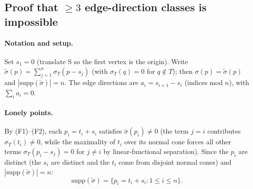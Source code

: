 %
%
%

\subsection*{Proof that $\geq 3$ edge-direction classes is impossible}

\paragraph{Notation and setup.}
Set $s_1=0$ (translate S so the first vertex is the origin).
Write $\tilde\sigma(p)=\sum_{j=1}^n \sigma_T(p-s_j)$
(with $\sigma_T(q)=0$ for $q\notin T$); then $\sigma(p)=\tilde\sigma(p)$
and $|\mathrm{supp}(\tilde\sigma)|=n$.
The edge directions are $a_i=s_{i+1}-s_i$ (indices mod $n$), with $\sum_i a_i=0$.

\paragraph{Lonely points.}
By (F1)--(F2), each $p_i=t_i+s_i$ satisfies $\tilde\sigma(p_i)\ne 0$
(the term $j=i$ contributes $\sigma_T(t_i)\ne0$, while the maximality of $t_i$
over its normal cone forces all other terms $\sigma_T(p_i-s_j)=0$ for $j\ne i$
by linear-functional separation).
Since the $p_i$ are distinct (the $s_i$ are distinct and the $t_i$ come from
disjoint normal cones) and $|\mathrm{supp}(\tilde\sigma)|=n$:
\begin{equation}\label{eq:lonely}
  \mathrm{supp}(\tilde\sigma)=\{p_i=t_i+s_i:1\le i\le n\}.
\end{equation}


